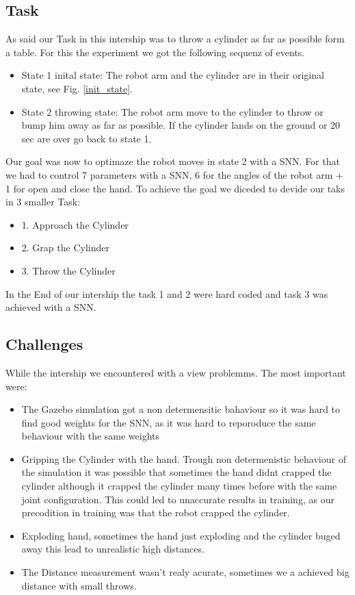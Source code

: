\subsection{Task}
As said our Task in this intership was to throw a cylinder as far as possible form a table. For this the experiment we got the following sequenz of events.
 \begin{itemize}
\item State 1 inital state: The robot arm and the cylinder are in their original state, see Fig. \ref{init_state}.
\item State 2 throwing state: The robot arm move to the cylinder to throw or bump him away as far as possible. If the cylinder lands on the ground or 20 sec are over go back to state 1.
\end{itemize}
Our goal was now to optimaze the robot moves in state 2 with a SNN. For that we had to control 7 parameters with a SNN, 6 for the angles of the robot arm + 1 for open and close the hand. 
To achieve the goal we diceded to devide our taks in 3 smaller Task:
 \begin{itemize}
\item 1. Approach the Cylinder
\item 2. Grap the Cylinder
\item 3. Throw the Cylinder
\end{itemize}
In the End of our intership the task 1 and 2 were hard coded and task 3 was achieved with a SNN.
\subsection{Challenges}
While the intership we encountered with a view problemms. The most important were:
 \begin{itemize}
\item The Gazebo simulation got a non determensitic bahaviour so it was hard to find good weights for the SNN, as it was hard to reporoduce the same behaviour with the same weights
\item Gripping the Cylinder with the hand. Trough non determenistic behaviour of the simulation it was possible that sometimes the hand didnt crapped the cylinder although it crapped the cylinder many times before with the same joint configuration. This could led to unaccurate results in training, as our precodition in training was that the robot crapped the cylinder.
\item Exploding hand, sometimes the hand just exploding and the cylinder buged away this lead to unrealistic high distances.
\item The Distance measurement wasn't realy acurate, sometimes we a achieved big distance with small throws.
\end{itemize}


